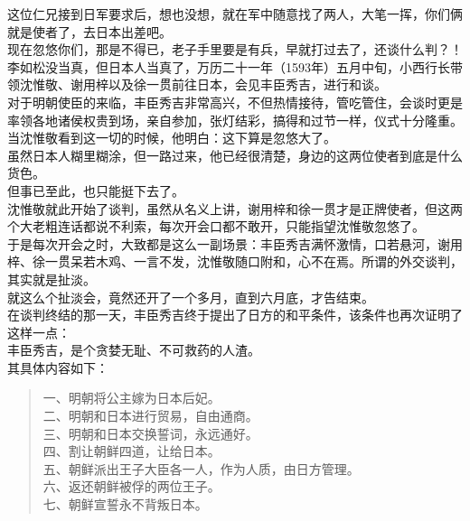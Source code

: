 \begin{multicols}{\theparacolNo}
这位仁兄接到日军要求后，想也没想，就在军中随意找了两人，大笔一挥，你们俩就是使者了，去日本出差吧。\\

现在忽悠你们，那是不得已，老子手里要是有兵，早就打过去了，还谈什么判？！\\

李如松没当真，但日本人当真了，万历二十一年（1593年）五月中旬，小西行长带领沈惟敬、谢用梓以及徐一贯前往日本，会见丰臣秀吉，进行和谈。\\

对于明朝使臣的来临，丰臣秀吉非常高兴，不但热情接待，管吃管住，会谈时更是率领各地诸侯权贵到场，亲自参加，张灯结彩，搞得和过节一样，仪式十分隆重。\\

当沈惟敬看到这一切的时候，他明白：这下算是忽悠大了。\\

虽然日本人糊里糊涂，但一路过来，他已经很清楚，身边的这两位使者到底是什么货色。\\

但事已至此，也只能挺下去了。\\

沈惟敬就此开始了谈判，虽然从名义上讲，谢用梓和徐一贯才是正牌使者，但这两个大老粗连话都说不利索，每次开会口都不敢开，只能指望沈惟敬忽悠了。\\

于是每次开会之时，大致都是这么一副场景：丰臣秀吉满怀激情，口若悬河，谢用梓、徐一贯呆若木鸡、一言不发，沈惟敬随口附和，心不在焉。所谓的外交谈判，其实就是扯淡。\\

就这么个扯淡会，竟然还开了一个多月，直到六月底，才告结束。\\

在谈判终结的那一天，丰臣秀吉终于提出了日方的和平条件，该条件也再次证明了这样一点：\\

丰臣秀吉，是个贪婪无耻、不可救药的人渣。\\

其具体内容如下：\\
{\footnotesize \begin{quote}
	一、明朝将公主嫁为日本后妃。\\
	二、明朝和日本进行贸易，自由通商。\\
	三、明朝和日本交换誓词，永远通好。\\
	四、割让朝鲜四道，让给日本。\\
	五、朝鲜派出王子大臣各一人，作为人质，由日方管理。\\
	六、返还朝鲜被俘的两位王子。\\
	七、朝鲜宣誓永不背叛日本。\\
\end{quote}}


\end{multicols}
